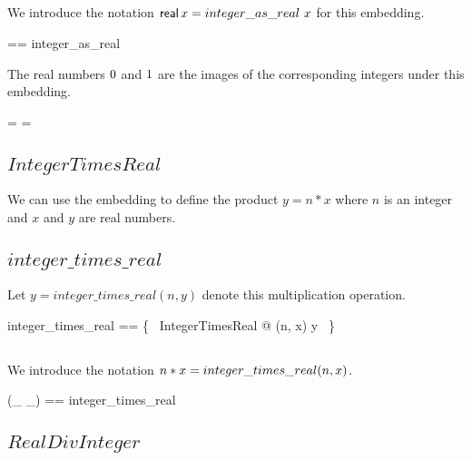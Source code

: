 \documentclass{amsart}
\begin{document}
\subsection{}

We introduce the notation $\operatorname{\mathsf{real}} x = integer\_as\_real~x$ for this embedding.

\begin{zed}
	\asZR == integer\_as\_real
\end{zed}

The real numbers $0$ and $1$ are the images of the corresponding integers under this
embedding.

\begin{zed}
	 = \zeroR
\also
	 = \oneR
\end{zed}

\subsection{$IntegerTimesReal$}

We can use the embedding to define the product $y = n * x$ where $n$ is an integer
and $x$ and $y$ are real numbers.


\subsection{$integer\_times\_real$}

Let $y = integer\_times\_real(n, y)$ denote this multiplication operation.

\begin{zed}
	integer\_times\_real == \{~ IntegerTimesReal @ (n, x) \mapsto y ~\}
\end{zed}

\subsection{}

We introduce the notation $n \mathbin{*} x = integer\_times\_real(n, x)$.

\begin{zed}
	(\_ \mulZR \_) == integer\_times\_real
\end{zed}

\subsection{$RealDivInteger$}
\end{document}
